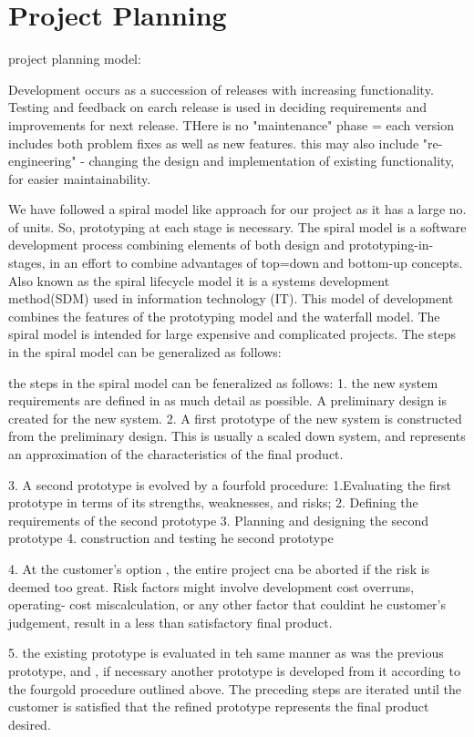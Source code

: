 \chapter{Project Planning}

project planning model:

Development occurs as a succession of releases with increasing functionality. Testing and feedback on earch release is used in deciding requirements and improvements for next release. THere is no "maintenance"
phase = each version includes both problem fixes as well as new features. this may also include "re-engineering" - changing the design and implementation of existing functionality, for easier maintainability. 

We have followed a spiral model like approach for our project as it has a large no. of units. So, prototyping at each stage is necessary. 
The spiral model is a software development process combining elements of both design and prototyping-in-stages, in an effort to combine advantages of top=down and bottom-up concepts. 
Also known as the spiral lifecycle model it is a systems development method(SDM) used in information technology (IT). This model of development combines the features of the prototyping model and the waterfall model. 
The spiral model is intended for large expensive and complicated projects. 
The steps in the spiral model can be generalized as follows:

the steps in the spiral model can be feneralized as follows:
1. the new system requirements are defined in as much detail as possible. A preliminary design is created for the new system. 
2. A first prototype of the new system is constructed from the preliminary design. This is usually a scaled down system, and represents an approximation of the characteristics of the final product. 

3. A second prototype is evolved by a fourfold procedure:
1.Evaluating the first prototype in terms of its strengths, weaknesses, and risks;
2. Defining the requirements of the second prototype
3. Planning and designing the second prototype 
4. construction and testing he second prototype 

4. At the customer's option , the entire project cna be aborted if the risk is deemed too great. Risk factors might involve development cost overruns, operating- cost miscalculation, or any other factor that couldint he customer's judgement, result in a less than satisfactory final product.

5. the existing prototype is evaluated in teh same manner as was the previous prototype, and , if necessary another prototype is developed from it according to the fourgold procedure outlined above. 
The preceding steps are iterated until the customer is satisfied that the refined prototype represents the final product desired. 


